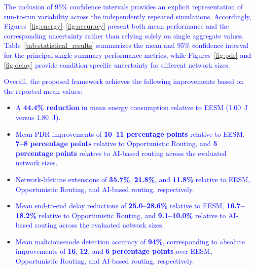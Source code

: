 \documentclass[pdflatex,sn-mathphys-num]{sn-jnl}
\begin{document}
\textcolor{blue}{The inclusion of 95\% confidence intervals provides an
explicit representation of run-to-run variability across the independently
repeated simulations. Accordingly, Figures~\ref{fig:energy}--\ref{fig:accuracy}
present both mean performance and the corresponding uncertainty rather than
relying solely on single aggregate values. Table~\ref{tab:statistical_results}
summarizes the mean and 95\% confidence interval for the principal
single-summary performance metrics, while Figures~\ref{fig:pdr} and
\ref{fig:delay} provide condition-specific uncertainty for different network
sizes.}



\textcolor{blue}{Overall, the proposed framework achieves the following
improvements based on the reported mean values:}

\begin{itemize}

    \item \textcolor{blue}{A \textbf{44.4\% reduction} in mean energy
    consumption relative to EESM (1.00~J versus 1.80~J).}

    \item \textcolor{blue}{Mean PDR improvements of
    \textbf{10--11 percentage points} relative to EESM,
    \textbf{7--8 percentage points} relative to Opportunistic Routing,
    and \textbf{5 percentage points} relative to AI-based routing across
    the evaluated network sizes.}

    \item \textcolor{blue}{Network-lifetime extensions of
    \textbf{35.7\%}, \textbf{21.8\%}, and \textbf{11.8\%} relative to
    EESM, Opportunistic Routing, and AI-based routing, respectively.}

    \item \textcolor{blue}{Mean end-to-end delay reductions of
    \textbf{25.0--28.6\%} relative to EESM,
    \textbf{16.7--18.2\%} relative to Opportunistic Routing, and
    \textbf{9.1--10.0\%} relative to AI-based routing across the evaluated
    network sizes.}

    \item \textcolor{blue}{Mean malicious-node detection accuracy of
    \textbf{94\%}, corresponding to absolute improvements of
    \textbf{16}, \textbf{12}, and \textbf{6 percentage points} over EESM,
    Opportunistic Routing, and AI-based routing, respectively.}

\end{itemize}
\end{document}
